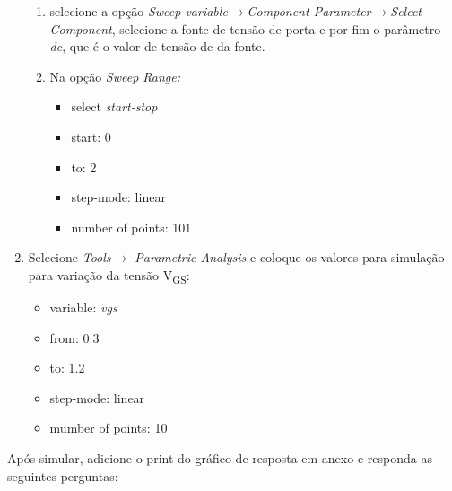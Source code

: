 \begin{questions}
\begin{enumerate}
    \begin{enumerate}
        \item selecione a opção {\em Sweep variable$\rightarrow$Component Parameter$\rightarrow$Select Component}, selecione a fonte de tensão de porta e por fim o parâmetro {\em dc}, que é o valor de tensão dc da fonte.
        \item Na opção {\em Sweep Range:}
            \begin{itemize}
                \item select {\em start-stop}
                \item start: 0
                \item to: 2
                \item step-mode: linear
                \item number of points: 101
            \end{itemize}    
        \end{enumerate}
    \item Selecione {\em Tools$\rightarrow$ Parametric Analysis} e coloque os valores para simulação para variação da tensão V\textsubscript{GS}:
        \begin{itemize}
            \item variable: {\em vgs}
            \item from: 0.3
            \item to: 1.2
            \item step-mode: linear
            \item mumber of points: 10
        \end{itemize}
\end{enumerate}
Após simular, adicione o print do gráfico de resposta em anexo e responda as seguintes perguntas:
\end{questions}


